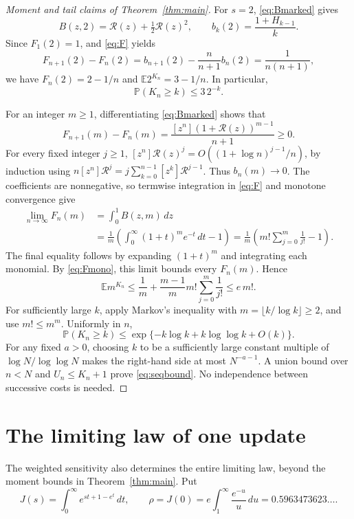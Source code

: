 \documentclass[runningheads,envcountsame,orivec]{llncs}
\newcommand{\E}{\mathbb E}
\newcommand{\PP}{\mathbb P}
\newcommand{\R}{\mathcal R}
\begin{document}
\begin{proof}[Moment and tail claims of Theorem~\ref{thm:main}]
For $s=2$, \eqref{eq:Bmarked} gives
\[
 B(z,2)=\R(z)+\tfrac12\R(z)^2,
 \qquad b_k(2)=\frac{1+H_{k-1}}{k}.
\]
Since $F_1(2)=1$, and \eqref{eq:F} yields
\[
 F_{n+1}(2)-F_n(2)
 =b_{n+1}(2)-\frac n{n+1}b_n(2)=\frac1{n(n+1)},
\]
we have $F_n(2)=2-1/n$ and $\E2^{K_n}=3-1/n$. In particular,
\begin{equation}\label{eq:geomtail}
 \PP(K_n\ge k)\le 3\,2^{-k}.
\end{equation}

For an integer $m\ge1$, differentiating \eqref{eq:Bmarked} shows that
\begin{equation}\label{eq:Fmono}
 F_{n+1}(m)-F_n(m)
 =\frac{[z^n](1+\R(z))^{m-1}}{n+1}\ge0.
\end{equation}
For every fixed integer $j\ge1$,
$[z^n]\R(z)^j=O((1+\log n)^{j-1}/n)$, by induction using
$n[z^n]\R^j=j\sum_{k=0}^{n-1}[z^k]\R^{j-1}$.
Thus $b_n(m)\to0$. The coefficients are nonnegative, so termwise
integration in \eqref{eq:F} and monotone convergence give
\begin{align*}
 \lim_{n\to\infty}F_n(m)
 &=\int_0^1 B(z,m)\,dz\\
 &=\frac1m\left(\int_0^\infty (1+t)^m e^{-t}\,dt-1\right)
 =\frac1m\left(m!\sum_{j=0}^m\frac1{j!}-1\right).
\end{align*}
The final equality follows by expanding $(1+t)^m$ and integrating each
monomial. By \eqref{eq:Fmono}, this limit bounds every $F_n(m)$.
Hence
\[
 \E m^{K_n}\le\frac1m+\frac{m-1}{m}
                 m!\sum_{j=0}^m\frac1{j!}\le e\,m!.
\]
For sufficiently large $k$, apply Markov's inequality with
$m=\lfloor k/\log k\rfloor\ge2$, and use $m!\le m^m$. Uniformly in $n$,
\begin{equation}\label{eq:strongtail}
 \PP(K_n\ge k)
 \le \exp\{-k\log k+k\log\log k+O(k)\}.
\end{equation}
For any fixed $a>0$, choosing $k$ to be a sufficiently large constant
multiple of $\log N/\log\log N$ makes the right-hand side at most
$N^{-a-1}$. A union bound over $n<N$ and $U_n\le K_n+1$ prove
\eqref{eq:seqbound}. No independence between successive costs is needed.
\end{proof}

\section{The limiting law of one update}\label{sec:limit}

The weighted sensitivity also determines the entire limiting law,
beyond the moment bounds in Theorem~\ref{thm:main}. Put
\[
 J(s)=\int_0^\infty e^{st+1-e^t}\,dt,\qquad
 \rho=J(0)=e\int_1^\infty\frac{e^{-u}}u\,du
       =0.5963473623\ldots.
\]
\end{document}

